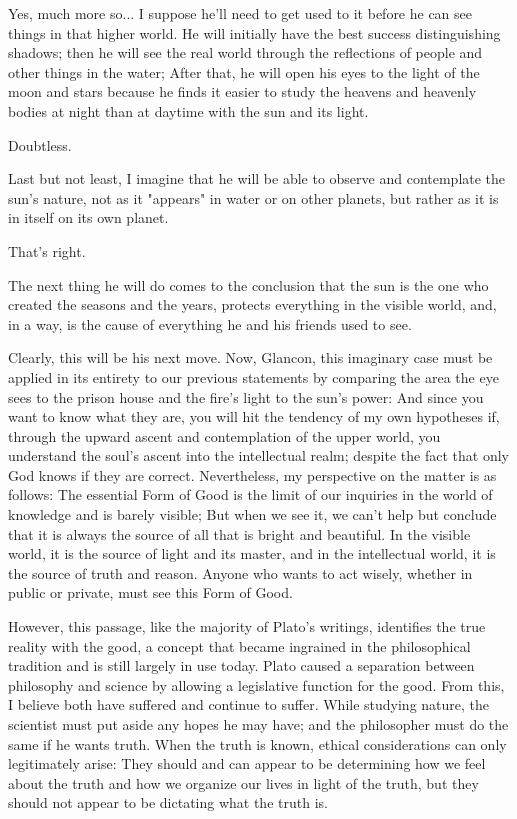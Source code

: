 \documentclass[a4paper,12pt]{book}[2004/02/16]
\theoremstyle{ilemma}
\theoremstyle{itheorem}
\theoremstyle{iother}
\theoremstyle{icorollary}
\theoremstyle{numcorollary}
\theoremstyle{idefinition}
\begin{document}
  Yes, much more so... I suppose he'll need to get used to it before he can see things in that higher world. He will initially have the best success distinguishing shadows; then he will see the real world through the reflections of people and other things in the water; After that, he will open his eyes to the light of the moon and stars because he finds it easier to study the heavens and heavenly bodies at night than at daytime with the sun and its light.

  Doubtless.

  Last but not least, I imagine that he will be able to observe and contemplate the sun's nature, not as it "appears" in water or on other planets, but rather as it is in itself on its own planet.

  That's right.

  The next thing he will do comes to the conclusion that the sun is the one who created the seasons and the years, protects everything in the visible world, and, in a way, is the cause of everything he and his friends used to see.

  Clearly, this will be his next move. Now, Glancon, this imaginary case must be applied in its entirety to our previous statements by comparing the area the eye sees to the prison house and the fire's light to the sun's power: And since you want to know what they are, you will hit the tendency of my own hypotheses if, through the upward ascent and contemplation of the upper world, you understand the soul's ascent into the intellectual realm; despite the fact that only God knows if they are correct. Nevertheless, my perspective on the matter is as follows: The essential Form of Good is the limit of our inquiries in the world of knowledge and is barely visible; But when we see it, we can't help but conclude that it is always the source of all that is bright and beautiful. In the visible world, it is the source of light and its master, and in the intellectual world, it is the source of truth and reason. Anyone who wants to act wisely, whether in public or private, must see this Form of Good.

However, this passage, like the majority of Plato's writings, identifies the true reality with the good, a concept that became ingrained in the philosophical tradition and is still largely in use today. Plato caused a separation between philosophy and science by allowing a legislative function for the good. From this, I believe both have suffered and continue to suffer. While studying nature, the scientist must put aside any hopes he may have; and the philosopher must do the same if he wants truth. When the truth is known, ethical considerations can only legitimately arise: They should and can appear to be determining how we feel about the truth and how we organize our lives in light of the truth, but they should not appear to be dictating what the truth is.
\end{document}
